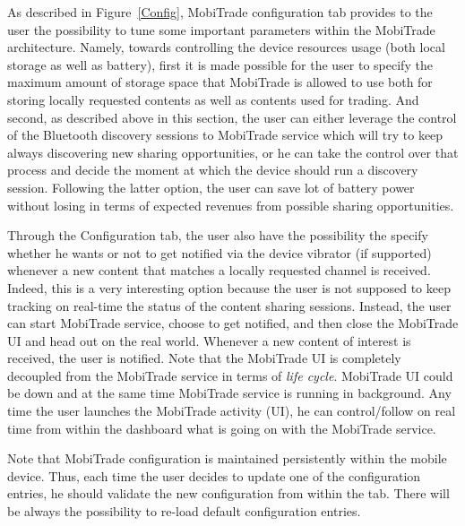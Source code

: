 As described in Figure~\ref{Config}, MobiTrade configuration tab provides to the user the possibility to tune some important parameters within the MobiTrade architecture. Namely, towards controlling the device resources usage (both local storage as well as battery), first it is made possible for the user to specify the maximum amount of storage space that MobiTrade is allowed to use both for storing locally requested contents as well as contents used for trading. And second, as described above in this section, the user can either leverage the control of the Bluetooth discovery sessions to MobiTrade service which will try to keep always discovering new sharing opportunities, or he can take the control over that process and decide the moment at which the device should run a discovery session. Following the latter option, the user can save lot of battery power without losing in terms of expected revenues from possible sharing opportunities.

Through the Configuration tab, the user also have the possibility the specify whether he wants or not to get notified via the device vibrator (if supported) whenever a new content that matches a locally requested channel is received. Indeed, this is a very interesting option because the user is not supposed to keep tracking on real-time the status of the content sharing sessions. Instead, the user can start MobiTrade service, choose to get notified, and then close the MobiTrade UI and head out on the real world. Whenever a new content of interest is received, the user is notified. Note that the MobiTrade UI is completely decoupled from the MobiTrade service in terms of \emph{life cycle}. MobiTrade UI could be down and at the same time MobiTrade service is running in background. Any time the user launches the MobiTrade activity (UI), he can control/follow on real time from within the dashboard what is going on with the MobiTrade service.

Note that MobiTrade configuration is maintained persistently within the mobile device. Thus, each time the user decides to update one of the configuration entries, he should validate the new configuration from within the tab. There will be always the possibility to re-load default configuration entries.

